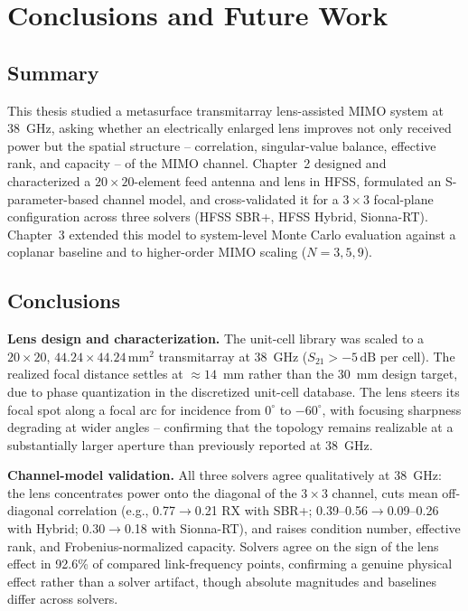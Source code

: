 \chapter{Conclusions and Future Work}

\section{Summary}
This thesis studied a metasurface transmitarray lens-assisted MIMO system at 38~GHz, asking whether an electrically enlarged lens improves not only received power but the spatial structure -- correlation, singular-value balance, effective rank, and capacity -- of the MIMO channel. Chapter~2 designed and characterized a $20\times20$-element feed antenna and lens in HFSS, formulated an S-parameter-based channel model, and cross-validated it for a $3\times3$ focal-plane configuration across three solvers (HFSS SBR+, HFSS Hybrid, Sionna-RT). Chapter~3 extended this model to system-level Monte Carlo evaluation against a coplanar baseline and to higher-order MIMO scaling ($N=3,5,9$).

\section{Conclusions}

\textbf{Lens design and characterization.} The unit-cell library was scaled to a $20\times20$, $44.24\times44.24\,\text{mm}^2$ transmitarray at 38~GHz ($S_{21}>-5\,\text{dB}$ per cell). The realized focal distance settles at $\approx14$~mm rather than the 30~mm design target, due to phase quantization in the discretized unit-cell database. The lens steers its focal spot along a focal arc for incidence from $0^\circ$ to $-60^\circ$, with focusing sharpness degrading at wider angles -- confirming that the topology remains realizable at a substantially larger aperture than previously reported at 38~GHz.

\textbf{Channel-model validation.} All three solvers agree qualitatively at 38~GHz: the lens concentrates power onto the diagonal of the $3\times3$ channel, cuts mean off-diagonal correlation (e.g., 0.77$\to$0.21 RX with SBR+; 0.39--0.56$\to$0.09--0.26 with Hybrid; 0.30$\to$0.18 with Sionna-RT), and raises condition number, effective rank, and Frobenius-normalized capacity. Solvers agree on the sign of the lens effect in 92.6\% of compared link-frequency points, confirming a genuine physical effect rather than a solver artifact, though absolute magnitudes and baselines differ across solvers.

